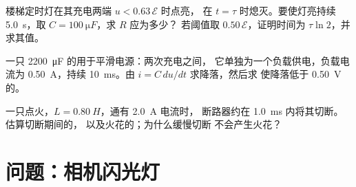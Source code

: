 \begin{exercise}[$\star\star\star$]\label{exo:g12:rc-rl-circuits:13}
楼梯定时灯在其充电两端 $u < 0.63\,\mathcal{E}$ 时点亮，
在 $t = \tau$ 时熄灭。要使灯亮持续
\qty{5.0}{s}，取 $C = \qty{100}{\micro F}$，求 $R$ 应为多少？
若阈值取 $0.50\,\mathcal{E}$，证明时间为 $\tau \ln 2$，并求其值。
\end{exercise}

\begin{exercise}[$\star\star\star$]\label{exo:g12:rc-rl-circuits:14}
一只 \qty{2200}{\micro F} 的用于平滑电源：两次充电之间，
它单独为一个负载供电，负载电流为 \qty{0.50}{A}，持续 \qty{10}{ms}。由
$i = C\,du/dt$ 求降落，然后求
使降落低于 \qty{0.50}{V} 的。
\end{exercise}

\begin{exercise}[$\star\star\star$]\label{exo:g12:rc-rl-circuits:15}
一只点火，$L = \qty{0.80}{H}$，通有 \qty{2.0}{A} 电流时，
断路器约在 \qty{1.0}{ms} 内将其切断。估算切断期间的，
以及火花的；为什么缓慢切断
不会产生火花？
\end{exercise}

\section{问题：相机闪光灯}

